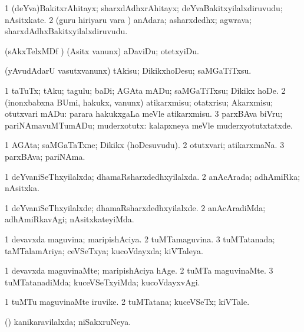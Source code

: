 \bentry
{}
\gl{\nA}
\bmng
\bnum
\num{1} (deYva)BakitxrAhitayx; sharxdAdhxrAhitayx; deYvaBakitxyilalxdiruvudu; nAsitxkate. 
\num{2} (guru hiriyaru \mo vara \vi) anAdara; asharxdedhx; agwrava; sharxdAdhxBakitxyilalxdiruvudu. 
\enum
\emng
\eentry

\bentry
{}
\gl{\sakirx}
\bmng
(sAkxTelxMDf \parx) (Asitx \mo vanunx) aDaviDu; otetxyiDu. 
\emng
\eentry

\bentry
{}
\gl{\sakirx}
\bmng
(yAvudAdarU vasutxvanunx) tAkisu; DikikxhoDesu; saMGaTiTxsu. 
\emng

\noindent
\gl{\akirx}
\bmng
\bnum
\num{1} taTuTx; tAku; tagulu; baDi; AGAta mADu; saMGaTiTxsu; Dikikx hoDe. 
\num{2} (inonxbabxna BUmi, hakukx, \mo vanunx) atikarxmisu; otatxrisu; Akarxmisu; otutxvari mADu:  parara hakukxgaLa meVle atikarxmisu. 
\num{3} parxBAva biVru; pariNAmavuMTumADu; muderxotutx:  kalapxneya meVle muderxyotutxtatxde. 
\enum
\emng
\eentry

\bentry
{}
\gl{\nA}
\bmng
\bnum
\num{1} AGAta; saMGaTaTxne; Dikikx (hoDesuvudu). 
\num{2} otutxvari; atikarxmaNa. 
\num{3} parxBAva; pariNAma. 
\enum
\emng
\eentry

\bentry
{}
\gl{\gu}
\bmng
\bnum
\num{1} deYvaniSeThxyilalxda; dhamaRsharxdedhxyilalxda. 
\num{2} anAcArada; adhAmiRka; nAsitxka. 
\enum
\emng
\eentry

\bentry
{}
\gl{\kirxvi}
\bmng
\bnum
\num{1} deYvaniSeThxyilalxde; dhamaRsharxdedhxyilalxde. 
\num{2} anAcAradiMda; adhAmiRkavAgi; nAsitxkateyiMda. 
\enum
\emng
\eentry

\bentry
{}
\gl{\gu}
\bmng
\bnum
\num{1} devavxda maguvina; maripishAciya. 
\num{2} tuMTamaguvina. 
\num{3} tuMTatanada; taMTalamAriya; ceVSeTxya; kucoVdayxda; kiVTaleya. 
\enum
\emng
\eentry

\bentry
{}
\gl{\kirxvi}
\bmng
\bnum
\num{1} devavxda maguvinaMte; maripishAciya hAge. 
\num{2} tuMTa maguvinaMte. 
\num{3} tuMTatanadiMda; kuceVSeTxyiMda; kucoVdayxvAgi. 
\enum
\emng
\eentry

\bentry
{}
\gl{\nA}
\bmng
\bnum
\num{1} tuMTu maguvinaMte iruvike. 
\num{2} tuMTatana; kuceVSeTx; kiVTale. 
\enum
\emng
\eentry

\bentry
{}
\gl{\gu}
\bmng
(\kAparx) kanikaravilalxda; niSakxruNeya. 
\emng
\eentry

